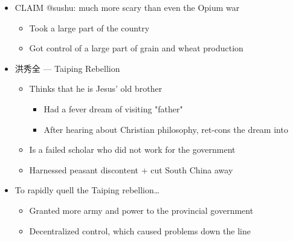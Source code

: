 \documentclass[letterpaper]{article}
\begin{document}
\begin{itemize}
\item CLAIM @sushu: much more scary than even the Opium war

\begin{itemize}
\item Took a large part of the country
\item Got control of a large part of grain and wheat production
\end{itemize}

\item 洪秀全 --- Taiping Rebellion

\begin{itemize}
\item Thinks that he is Jesus' old brother

\begin{itemize}
\item Had a fever dream of visiting "father"
\item After hearing about Christian philosophy, ret-cons the dream into
\end{itemize}

\item Is a failed scholar who did not work for the government
\item Harnessed peasant discontent + cut South China away
\end{itemize}

\item To rapidly quell the Taiping rebellion\ldots{}

\begin{itemize}
\item Granted more army and power to the provincial government
\item Decentralized control, which caused problems down the line
\end{itemize}
\end{itemize}
\end{document}
